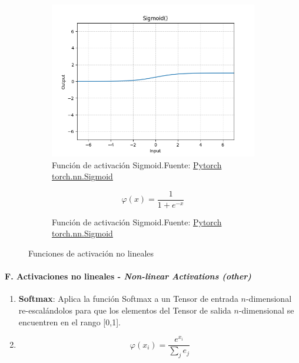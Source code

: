 \begin{figure}[H]
    \medskip
    \begin{subfigure}{.475\linewidth}
        \centering
        \includegraphics[width=0.75\linewidth]{figures/equations/Sigmoid.png}
        \caption{Función de activación Sigmoid.\newline{}Fuente: \href{https://pytorch.org/docs/stable/generated/torch.nn.Sigmoid.html}{Pytorch torch.nn.Sigmoid}}
        \label{subfig:torch.nn.Sigmoid}
    \end{subfigure}\hfill
    \begin{subfigure}{.475\linewidth}
        \centering
        \begin{equation*} \varphi(x) = \frac{1}{1+e^{-x}} \label{eq:sigmoid} \end{equation*}
        \caption{Función de activación Sigmoid.\newline{}Fuente: \href{https://pytorch.org/docs/stable/generated/torch.nn.Sigmoid.html}{Pytorch torch.nn.Sigmoid}}
        \label{subfig:eq-torch.nn.Sigmoid}
    \end{subfigure}

    \caption{Funciones de activación no lineales}
    \label{fig:p2--equations--Non-linear-Activations}
\end{figure}


\paragraph*{F. Activaciones no lineales - \textit{Non-linear Activations (other)} \cite{pytorch2024github}}

\begin{enumerate}
    \item \textbf{Softmax}: Aplica la función Softmax a un Tensor de entrada $n$-dimensional re-escalándolos para que los elementos del Tensor de salida $n$-dimensional se encuentren en el rango [0,1]. \cite{pytorch2024github}
    \item[] \begin{equation} \varphi(x_{i}) = \frac{e^{x_{i}}}{\sum_{j}{e_{j}}} \end{equation}
\end{enumerate}


